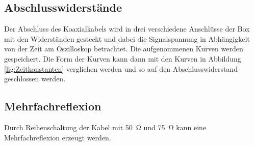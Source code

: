 \subsection*{Abschlusswiderstände}
Der Abschluss des Koaxialkabels wird in drei verschiedene Anschlüsse der Box mit den Widerständen gesteckt und dabei die Signalspannung in Abhängigkeit von der Zeit am Oszilloskop betrachtet. Die aufgenommenen Kurven werden gespeichert. Die Form der Kurven kann dann mit den Kurven in Abbildung \ref{fig:Zeitkonstanten} verglichen werden und so auf den Abschlusswiderstand geschlossen werden.
\subsection*{Mehrfachreflexion}
Durch Reihenschaltung der Kabel mit \SI{50}{\ohm} und \SI{75}{\ohm} kann eine Mehrfachreflexion erzeugt werden. 
